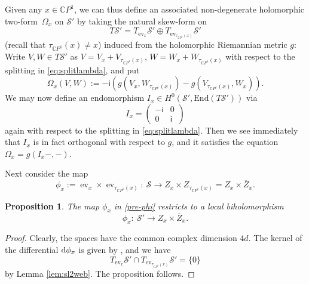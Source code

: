 \documentclass[pdftex]{sigma}
\numberwithin{equation}{section}
\newtheorem{Proposition}[Theorem]{Proposition}
\theoremstyle{definition}
\newcommand\C{{\mathbb C}}
\renewcommand{\i}{\mathsf{i}}
\begin{document}
Given any $x \in \C P^1$, we can thus define an associated non-degenerate holomorphic two-form~$\Omega_x$ on $\mathcal S'$
by taking the natural skew-form on
\begin{equation}\label{eq:splitlambda}
T\mathcal S' = T_{\operatorname{ev}_{x}}\mathcal S' \oplus T_{\operatorname{ev}_{\tau_{\C P^1}(x)}}\mathcal S'
\end{equation}
(recall that $\tau_{\C P^1}(x) \not= x$) induced from the holomorphic Riemannian metric
$g$: Write $V, W \in T\mathcal S' $ as $V = V_x + V_{\tau_{\C P^1}(x)}$, $W =
W_x + W_{\tau_{\C P^1}(x)}$ with respect to the splitting in \eqref{eq:splitlambda}, and put
\begin{equation}\label{eq:defOmegalambda}
\Omega_x(V, W) := -\i(g(V_x,W_{\tau_{\C P^1}(x)}) - g(V_{\tau_{\C P^1}(x)},W_x)).
\end{equation}
We may now define an endomorphism $I_x \in H^0(\mathcal{S'}, \mathrm{End}(T\mathcal S'))$ via
\begin{equation}\label{eq:Ilambda}
I_x = \begin{pmatrix}
-\i & 0 \\ 0& \i
\end{pmatrix}
\end{equation}
again with respect to the splitting in \eqref{eq:splitlambda}.
Then we see immediately that $I_x$ is in fact orthogonal with respect to $g$, and it satisfies the equation
$
\Omega_x = g(I_x -,-)$.

Next consider the map
\begin{equation}\label{pre-phi}
\phi_{x} := \operatorname{ev}_x\times\operatorname{ev}_{\tau_{\C P^1}(x)} \colon \
\mathcal S \longrightarrow Z_x \times Z_{\tau_{\C P^1}(x)} = Z_x\times \overline{Z}_x.
\end{equation}

\begin{Proposition}\label{p:local biholo}
The map $\phi_x$ in \eqref{pre-phi} restricts to a local biholomorphism
\[\phi_x \colon\ \mathcal{S}'
 \longrightarrow Z_x\times \overline{Z}_x.\]
\end{Proposition}

\begin{proof}
Clearly, the spaces have the common complex dimension $4d$. The kernel of the differential
${\rm d}\phi_x$ is given by \smash{$T_{\operatorname{ev}_{x}}\mathcal S'\cap
T_{\operatorname{ev}_{\tau_{\C P^1}(x)}}\mathcal S'$}, and we have
\[T_{\operatorname{ev}_{x}}\mathcal S'\cap T_{\operatorname{ev}_{\tau_{\C P^1}(x)}}\mathcal S' = \{0\}\]
 by
Lemma \ref{lem:sl2web}. The proposition follows.
\end{proof}
\end{document}
